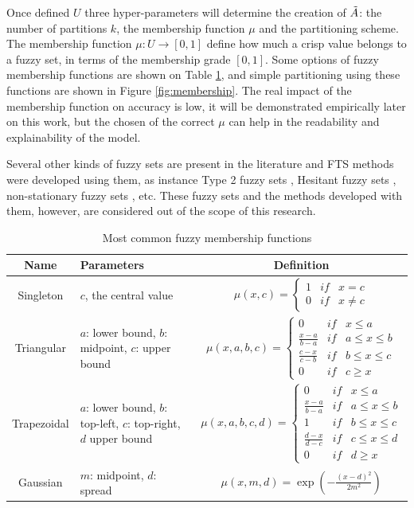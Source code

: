 Once defined $U$ three hyper-parameters will determine the creation of $\tilde{A}$: the number of partitions $k$, the membership function $\mu$ and the partitioning scheme. The membership function $\mu: U \rightarrow [0,1]$ define how much a crisp value belongs to a fuzzy set, in terms of the membership grade $[0,1]$. Some options of fuzzy membership functions are shown on Table \ref{tab:fts_membership}, and simple partitioning using these functions are shown in Figure \ref{fig:membership}. The real impact of the membership function on accuracy is low, it will be demonstrated empirically later on this work, but the chosen of the correct $\mu$ can help in the readability and explainability of the model.

Several other kinds of fuzzy sets are present in the literature and FTS methods were developed using them, as instance Type 2 fuzzy sets \cite{huarng2005type, Bajestani2011}, Hesitant fuzzy sets \cite{}, non-stationary fuzzy sets \cite{}, etc. These fuzzy sets and the methods developed with them, however, are considered out of the scope of this research.

\index{$\mu$}
\begin{table}[]
    \centering
\begin{tabular}{|c|m{4cm}|c|} \hline
\textbf{Name}  & \textbf{Parameters}  & \textbf{Definition} \\ \hline
Singleton  & $c$, the central value & 
$\mu(x,c) = \left\{ \begin{array}{ccc}
        1 & if & x = c  \\
        0 & if & x \neq c
    \end{array}\right.$ \\ \hline
Triangular  & $a$: lower bound, $b$: midpoint, $c$: upper bound  & 
$\mu(x,a,b,c) = \left\{ \begin{array}{ccc}
        0 & if & x \leq a  \\
        \frac{x-a}{b-a} & if & a \leq x \leq b  \\
        \frac{c-x}{c-b} & if & b \leq x \leq c  \\
        0 & if & c \geq x
    \end{array}\right.$ \\ \hline
Trapezoidal  & $a$: lower bound, $b$: top-left, $c$: top-right, $d$ upper bound & 
$\mu(x,a,b,c,d) = \left\{ \begin{array}{ccc}
        0 & if & x \leq a  \\
        \frac{x-a}{b-a} & if & a \leq x \leq b  \\
        1 & if & b \leq x \leq c  \\
        \frac{d-x}{d-c} & if & c \leq x \leq d  \\
        0 & if & d \geq x
    \end{array}\right.$ \\ \hline
Gaussian  & $m$: midpoint, $d$: spread & 
$\mu(x,m,d) = \exp \left(-\frac{(x-d)^2}{2m^2}\right)$ \\ \hline
\end{tabular}
\caption{Most common fuzzy membership functions}
    \label{tab:fts_membership}
\end{table}

